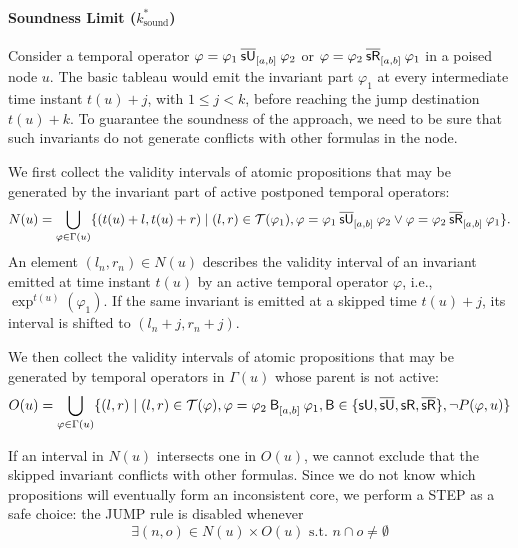 \documentclass{easychair}
\begin{document}
\paragraph{Soundness Limit ($k^{\ast}_{\text{sound}}$)}

Consider a temporal operator $\varphi = \msuntil{[a,b]}{\varphi_1}{\varphi_2}$ or $\varphi = \msrelease{[a,b]}{\varphi_2}{\varphi_1}$ in a poised node $u$.
The basic tableau would emit the invariant part $\varphi_1$ at every
intermediate time instant $t(u)+j$, with $1 \leq j < k$, before reaching the
jump destination $t(u)+k$.
%
To guarantee the soundness of the approach, we need to be sure that such invariants do not generate conflicts with other formulas in the node. 

We first collect the validity intervals of atomic propositions that may be
generated by the invariant part of active postponed temporal operators:
%
\begin{align*}
    N(u) = \bigcup\limits_{\varphi \in \Gamma(u)} \set{(t(u) + l, t(u) + r) \mid (l, r) \in \tinv(\varphi_1), \varphi = \msuntil{[a,b]}{\varphi_1}{\varphi_2} \lor \varphi = \msrelease{[a,b]}{\varphi_2}{\varphi_1}}.
\end{align*}
An element $(l_n,r_n)\in N(u)$ describes the validity interval of an invariant emitted at time instant $t(u)$ by an active temporal operator $\varphi$, i.e., $\exp^{t(u)}(\varphi_1)$.
If the same invariant is emitted at a skipped time $t(u)+j$, its interval is shifted to $(l_n+j,r_n+j)$.

We then collect the validity intervals of atomic propositions that may be
generated by temporal operators in $\Gamma(u)$ whose parent is not active:
%
\begin{align*}
    O(u) = \bigcup\limits_{\varphi \in \Gamma(u)} \set{(l,r) \mid (l,r) \in \tinv(\varphi), \varphi = \anybinop{[a,b]}{\varphi_2}{\varphi_1}, \mathsf{B} \in \set{\suntilop, \marked{\suntilop}, \sreleaseop, \marked{\sreleaseop}}, \lnot \pactive(\varphi, u)} 
\end{align*}

If an interval in $N(u)$ intersects one in $O(u)$, we cannot exclude that the skipped invariant conflicts with other formulas.
Since we do not know which propositions will eventually form an inconsistent core, we perform a \textsf{STEP} as a safe choice:
the \textsf{JUMP} rule is disabled whenever
%
\begin{equation}
    \label{eq:sound-condition}
    \exists (n, o) \in N(u) \times O(u) \text{ s.t. } n \cap o \neq \emptyset
\end{equation}
\end{document}
